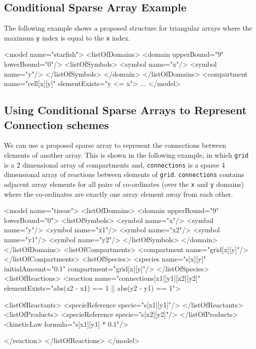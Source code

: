 \documentclass{cekarticle}
\begin{document}
\subsection{Conditional Sparse Array Example}
\label{sec:sparseeg}

The following example shows a proposed structure for triangular
arrays where the maximum \texttt{y} index is equal to the
\texttt{x} index.

\begin{example}
<model name="starfish">
    <listOfDomains>
        <domain upperBound="9" lowerBound="0"/>
            <listOfSymbols>
                <symbol name="x"/>
                <symbol name="y"/>
            </listOfSymbols>
        </domain>
    </listOfDomains>
    <compartment name="cell[x][y]" elementExists="y <= x">
    ...
</model>
\end{example}

\subsection{Using Conditional Sparse Arrays to Represent Connection schemes}
\label{sec:connections}

We can use a proposed sparse array to represent the connections
between elements of another array.  This is shown in the
following example, in which \texttt{grid} is a 2 dimensional
array of compartments and, \texttt{connections} is a sparse 4
dimensional array of reactions between elements of \texttt{grid}.
\texttt{connections} contains adjacent array elements for all
pairs of co-ordinates (over the \texttt{x} and \texttt{y}
domains) where the co-ordinates are exactly one array element
away from each other.

\begin{example}
<model name="tissue">
    <listOfDomains>
        <domain upperBound="9" lowerBound="0">
            <listOfSymbols>
                <symbol name="x"/>
                <symbol name="y"/>
                <symbol name="x1"/>
                <symbol name="x2"/>
                <symbol name="y1"/>
                <symbol name="y2"/>
            </listOfSymbols>
        </domain>
    </listOfDomains>
    <listOfCompartments>
        <compartment name="grid[x][y]"/>
    </listOfCompartments>
    <listOfSpecies>
        <species name="s[x][y]" initialAmount="0.1" compartment="grid[x][y]"/>
    </listOfSpecies>
    <listOfReactions>
        <reaction
                name="connections[x1][y1][x2][y2]"
                elementExists="abs(x2 - x1) == 1 || abs(y2 - y1) == 1">

            <listOfReactants>
                <specieReference specie="s[x1][y1]"/>
            </listOfReactants>
            <listOfProducts>
                <specieReference specie="s[x2][y2]"/>
            </listOfProducts>
            <kineticLaw formula="s[x1][y1] * 0.1"/>

        </reaction>
    </listOfReactions>
</model>
\end{example}
\end{document}
